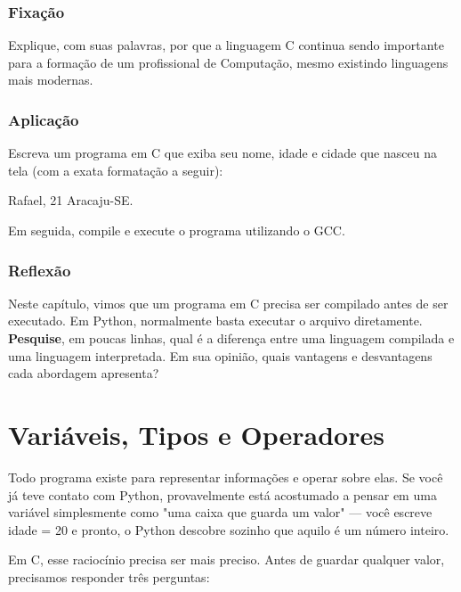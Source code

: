 \documentclass[12pt,a4paper,oneside]{extreport}
\begin{document}
\begin{exercicio}

\subsection*{Fixação} 
Explique, com suas palavras, por que a linguagem C continua sendo importante para a formação de um profissional de Computação, mesmo existindo linguagens mais modernas. \newline

\subsection*{Aplicação} 
Escreva um programa em C que exiba seu nome, idade e cidade que nasceu na tela (com a exata formatação a seguir):

\begin{terminal}
Rafael, 21
Aracaju-SE.
\end{terminal}

Em seguida, compile e execute o programa utilizando o GCC.

\subsection*{Reflexão} 
Neste capítulo, vimos que um programa em C precisa ser compilado antes de ser executado. Em Python, normalmente basta executar o arquivo diretamente.
\textbf{Pesquise}, em poucas linhas, qual é a diferença entre uma linguagem compilada e uma linguagem interpretada. Em sua opinião, quais vantagens e desvantagens cada abordagem apresenta?
    
\end{exercicio}

    



\chapter{Variáveis, Tipos e Operadores}

Todo programa existe para representar informações e operar sobre elas. Se você já teve contato com Python, provavelmente está acostumado a pensar em uma variável simplesmente como "uma caixa que guarda um valor" — você escreve idade = 20 e pronto, o Python descobre sozinho que aquilo é um número inteiro.

Em C, esse raciocínio precisa ser mais preciso. Antes de guardar qualquer valor, precisamos responder três perguntas:
\end{document}
